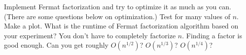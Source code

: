   Implement Fermat factorization and try to optimize it as much as you can.
  (There are some questions below on optimization.)
  Test for many values of $n$.
  Make a plot.
  What is the runtime of Fermat factorization algorithm based on your experiment?
  You don't have to completely factorize $n$.
  Finding a factor is good enough.
  Can you get roughly $O(n^{1/2})$? $O(n^{1/3})$? $O(n^{1/4})$?

